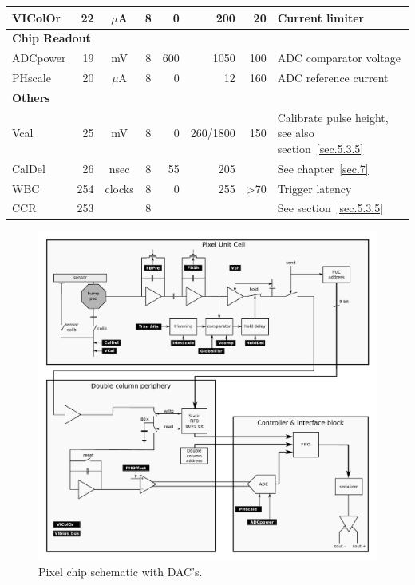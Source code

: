 \begin{table}[h]
\begin{center}
{\begin{tabular}{lrccrrrl}
	VIColOr     & 22 & $\mu$A  & 8 & 0 & 200 & 20 & Current limiter \\ 
	\midrule
	\multicolumn{ 8}{l}{\textbf{Chip Readout}} \\ 
	ADCpower    & 19 & mV & 8  & 600 & 1050 & 100 & ADC comparator voltage \\ 
	PHscale     & 20 & $\mu$A  & 8 & 0 & 12 & 160 & ADC reference current \\ 
	\midrule
	\multicolumn{ 8}{l}{\textbf{Others}} \\ 
	Vcal        & 25 & mV      & 8 & 0 & 260/1800 & 150 & Calibrate pulse height, see also section~\ref{sec.5.3.5} \\ 
	CalDel      & 26 & nsec    & 8 & 55 & 205 &  & See chapter~\ref{sec.7} \\ 
	WBC         & 254 & clocks & 8 & 0 & 255 &                 >70 & Trigger latency \\ 
	CCR         & 253 &        & 8 &  &  &  & See section~\ref{sec.5.3.5} \\ 
	\bottomrule
	\end{tabular}
	}
    \end{center}
\end{table}

\begin{figure}[hbtp]
	\begin{center}
	\includegraphics[width=.9\textwidth]{img/ROC_DACschema.pdf}
	\end{center}
	\caption{Pixel chip schematic with DAC's. }
	\label{fig:ROCDACschematic}
\end{figure}


